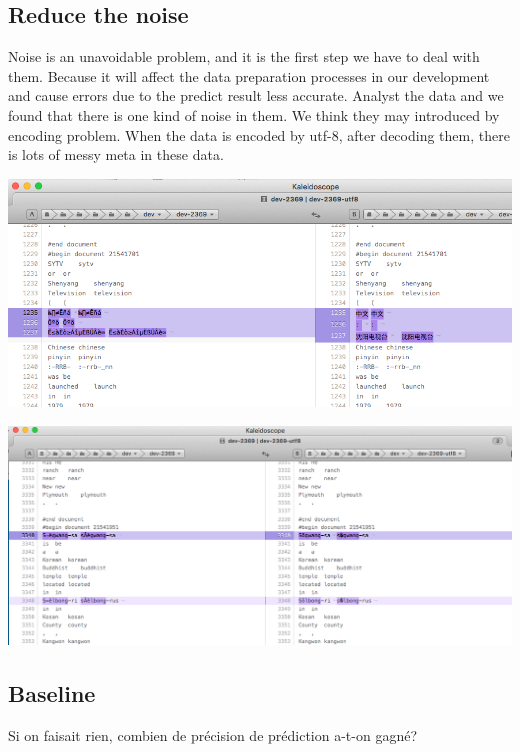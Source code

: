 \documentclass[a4paper]{article}
\begin{document}
\subsection{Reduce the noise}
Noise is an unavoidable problem, and it is the first step we have to deal with them. Because it will affect the data preparation processes in our development and cause errors due to the predict result less accurate.
Analyst the data and we found that there is one kind of noise in them. We think they may introduced by encoding problem. When the data is encoded by utf-8, after decoding them, there is lots of messy meta in these data. 

\begin{center}
\includegraphics[width=1\textwidth]{noise1.png}

\end{center}

\begin{center}

\includegraphics[width=1\textwidth]{noise2.png}
\end{center}

\subsection{Baseline}
Si on faisait rien, combien de précision de prédiction a-t-on gagné? 
\end{document}
